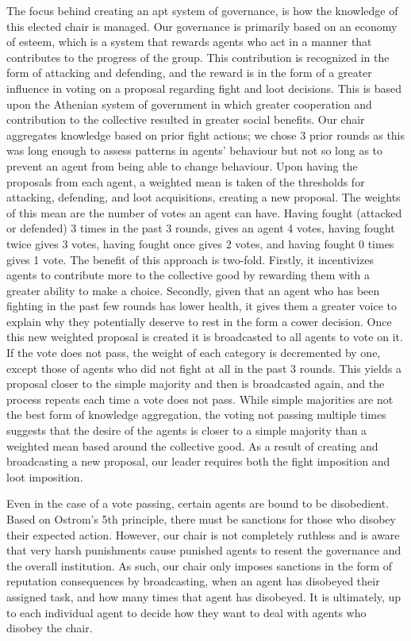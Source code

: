  \par The focus behind creating an apt system of governance, is how the knowledge of this elected chair is managed. Our governance is primarily based on an economy of esteem, which is a system that rewards agents who act in a manner that contributes to the progress of the group. This contribution is recognized in the form of attacking and defending, and the reward is in the form of a greater influence in voting on a proposal regarding fight and loot decisions. This is based upon the Athenian system of government in which greater cooperation and contribution to the collective resulted in greater social benefits. Our chair aggregates knowledge based on prior fight actions; we chose 3 prior rounds as this was long enough to assess patterns in agents’ behaviour but not so long as to prevent an agent from being able to change behaviour. Upon having the proposals from each agent, a weighted mean is taken of the thresholds for attacking, defending, and loot acquisitions, creating a new proposal. The weights of this mean are the number of votes an agent can have. Having fought (attacked or defended) 3 times in the past 3 rounds, gives an agent 4 votes, having fought twice gives 3 votes, having fought once gives 2 votes, and having fought 0 times gives 1 vote. The benefit of this approach is two-fold. Firstly, it incentivizes agents to contribute more to the collective good by rewarding them with a greater ability to make a choice. Secondly, given that an agent who has been fighting in the past few rounds has lower health, it gives them a greater voice to explain why they potentially deserve to rest in the form a cower decision. Once this new weighted proposal is created it is broadcasted to all agents to vote on it. If the vote does not pass, the weight of each category is decremented by one, except those of agents who did not fight at all in the past 3 rounds. This yields a proposal closer to the simple majority and then is broadcasted again, and the process repeats each time a vote does not pass. While simple majorities are not the best form of knowledge aggregation, the voting not passing multiple times suggests that the desire of the agents is closer to a simple majority than a weighted mean based around the collective good. As a result of creating and broadcasting a new proposal, our leader requires both the fight imposition and loot imposition.

\par Even in the case of a vote passing, certain agents are bound to be disobedient. Based on Ostrom’s 5th principle, there must be sanctions for those who disobey their expected action. However, our chair is not completely ruthless and is aware that very harsh punishments cause punished agents to resent the governance and the overall institution. As such, our chair only imposes sanctions in the form of reputation consequences by broadcasting, when an agent has disobeyed their assigned task, and how many times that agent has disobeyed. It is ultimately, up to each individual agent to decide how they want to deal with agents who disobey the chair.  

